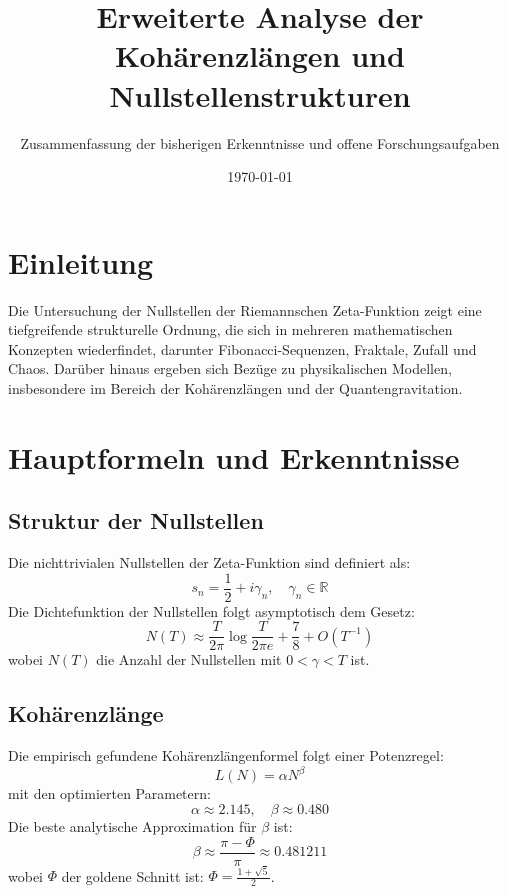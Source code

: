 \documentclass[a4paper,12pt]{article}
\title{Erweiterte Analyse der Kohärenzlängen und Nullstellenstrukturen}
\author{Zusammenfassung der bisherigen Erkenntnisse und offene Forschungsaufgaben}
\date{\today}
\begin{document}
\maketitle

\section{Einleitung}
Die Untersuchung der Nullstellen der Riemannschen Zeta-Funktion zeigt eine tiefgreifende strukturelle Ordnung, die sich in mehreren mathematischen Konzepten wiederfindet, darunter Fibonacci-Sequenzen, Fraktale, Zufall und Chaos. Darüber hinaus ergeben sich Bezüge zu physikalischen Modellen, insbesondere im Bereich der Kohärenzlängen und der Quantengravitation.

\section{Hauptformeln und Erkenntnisse}

\subsection{Struktur der Nullstellen}
Die nichttrivialen Nullstellen der Zeta-Funktion sind definiert als:
\begin{equation}
s_n = \frac{1}{2} + i \gamma_n, \quad \gamma_n \in \mathbb{R}
\end{equation}
Die Dichtefunktion der Nullstellen folgt asymptotisch dem Gesetz:
\begin{equation}
N(T) \approx \frac{T}{2\pi} \log \frac{T}{2\pi e} + \frac{7}{8} + O(T^{-1})
\end{equation}
wobei \( N(T) \) die Anzahl der Nullstellen mit \( 0 < \gamma < T \) ist.

\subsection{Kohärenzlänge}
Die empirisch gefundene Kohärenzlängenformel folgt einer Potenzregel:
\begin{equation}
L(N) = \alpha N^\beta
\end{equation}
mit den optimierten Parametern:
\begin{equation}
\alpha \approx 2.145, \quad \beta \approx 0.480
\end{equation}
Die beste analytische Approximation für \( \beta \) ist:
\begin{equation}
\beta \approx \frac{\pi - \Phi}{\pi} \approx 0.481211
\end{equation}
wobei \( \Phi \) der goldene Schnitt ist: \( \Phi = \frac{1+\sqrt{5}}{2} \).
\end{document}
